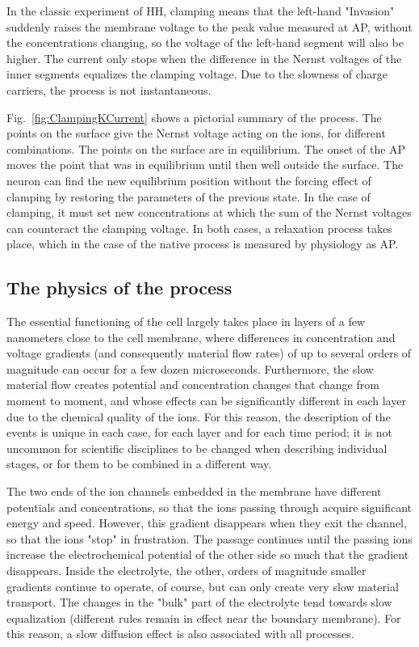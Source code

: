 In the classic experiment of \gls{HH}, clamping means that the left-hand "Invasion" suddenly raises the membrane voltage to the peak value measured at \gls{AP}, without the concentrations changing, so the voltage of the left-hand segment will also be higher.
The current only stops when the difference in the Nernst voltages of the inner segments equalizes
the clamping voltage. Due to the slowness of charge carriers, the process is not instantaneous.

Fig.~\ref{fig:ClampingKCurrent} shows a pictorial summary of the process. The points on the surface give the Nernst voltage acting on the ions, for different combinations. The points on the surface are in equilibrium. The onset of the \gls{AP} moves the point that was in equilibrium until then well outside the surface. The neuron can find the new equilibrium position without the forcing effect of clamping by restoring the parameters of the previous state. In the case of clamping, it must set new concentrations at which the sum of the Nernst voltages can counteract the clamping voltage. In both cases, a relaxation process takes place, which in the case of the native process is measured by physiology as \gls{AP}.

\subsection[The physics of the process]
{The physics of the process\label{sec:Fallacies-OutwardKPhysics}}

The essential functioning of the cell largely takes place in layers of a few nanometers close to the cell membrane, where differences in concentration and voltage gradients (and consequently material flow rates) of up to several orders of magnitude can occur for a few dozen microseconds. Furthermore, the slow material flow creates potential and concentration changes that change from moment to moment, and whose effects can be significantly different in each layer due to the chemical quality of the ions. For this reason, the description of the events is unique in each case, for each layer and for each time period; it is not uncommon for scientific disciplines to be changed when describing individual stages, or for them to be combined in a different way.

The two ends of the ion channels embedded in the membrane have different potentials and concentrations, so that the ions passing through acquire significant energy and speed. However, this gradient disappears when they exit the channel, so that the ions "stop" in frustration. The passage continues until the passing ions increase the electrochemical potential of the other side so much that the gradient disappears. Inside the electrolyte, the other, orders of magnitude smaller gradients continue to operate, of course, but can only create very slow material transport. The changes in the "bulk" part of the electrolyte tend towards slow equalization (different rules remain in effect near the boundary membrane). For this reason, a slow diffusion effect is also associated with all processes.

